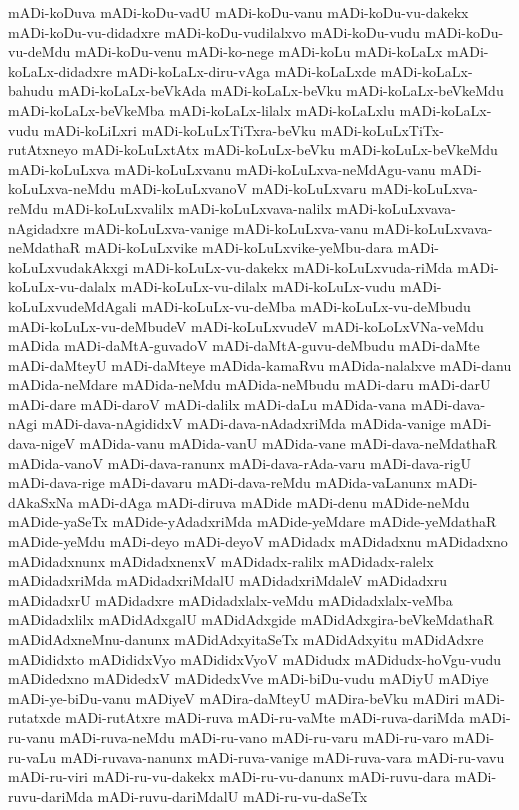 {mADi-koDuva
mADi-koDu-vadU
mADi-koDu-vanu
mADi-koDu-vu-dakekx
mADi-koDu-vu-didadxre
mADi-koDu-vudilalxvo
mADi-koDu-vudu
mADi-koDu-vu-deMdu
mADi-koDu-venu
mADi-ko-nege
mADi-koLu
mADi-koLaLx
mADi-koLaLx-didadxre
mADi-koLaLx-diru-vAga
mADi-koLaLxde
mADi-koLaLx-bahudu
mADi-koLaLx-beVkAda
mADi-koLaLx-beVku
mADi-koLaLx-beVkeMdu
mADi-koLaLx-beVkeMba
mADi-koLaLx-lilalx
mADi-koLaLxlu
mADi-koLaLx-vudu
mADi-koLiLxri
mADi-koLuLxTiTxra-beVku
mADi-koLuLxTiTx-rutAtxneyo
mADi-koLuLxtAtx
mADi-koLuLx-beVku
mADi-koLuLx-beVkeMdu
mADi-koLuLxva
mADi-koLuLxvanu
mADi-koLuLxva-neMdAgu-vanu
mADi-koLuLxva-neMdu
mADi-koLuLxvanoV
mADi-koLuLxvaru
mADi-koLuLxva-reMdu
mADi-koLuLxvalilx
mADi-koLuLxvava-nalilx
mADi-koLuLxvava-nAgidadxre
mADi-koLuLxva-vanige
mADi-koLuLxva-vanu
mADi-koLuLxvava-neMdathaR
mADi-koLuLxvike
mADi-koLuLxvike-yeMbu-dara
mADi-koLuLxvudakAkxgi
mADi-koLuLx-vu-dakekx
mADi-koLuLxvuda-riMda
mADi-koLuLx-vu-dalalx
mADi-koLuLx-vu-dilalx
mADi-koLuLx-vudu
mADi-koLuLxvudeMdAgali
mADi-koLuLx-vu-deMba
mADi-koLuLx-vu-deMbudu
mADi-koLuLx-vu-deMbudeV
mADi-koLuLxvudeV
mADi-koLoLxVNa-veMdu
mADida
mADi-daMtA-guvadoV
mADi-daMtA-guvu-deMbudu
mADi-daMte
mADi-daMteyU
mADi-daMteye
mADida-kamaRvu
mADida-nalalxve
mADi-danu
mADida-neMdare
mADida-neMdu
mADida-neMbudu
mADi-daru
mADi-darU
mADi-dare
mADi-daroV
mADi-dalilx
mADi-daLu
mADida-vana
mADi-dava-nAgi
mADi-dava-nAgididxV
mADi-dava-nAdadxriMda
mADida-vanige
mADi-dava-nigeV
mADida-vanu
mADida-vanU
mADida-vane
mADi-dava-neMdathaR
mADida-vanoV
mADi-dava-ranunx
mADi-dava-rAda-varu
mADi-dava-rigU
mADi-dava-rige
mADi-davaru
mADi-dava-reMdu
mADida-vaLanunx
mADi-dAkaSxNa
mADi-dAga
mADi-diruva
mADide
mADi-denu
mADide-neMdu
mADide-yaSeTx
mADide-yAdadxriMda
mADide-yeMdare
mADide-yeMdathaR
mADide-yeMdu
mADi-deyo
mADi-deyoV
mADidadx
mADidadxnu
mADidadxno
mADidadxnunx
mADidadxnenxV
mADidadx-ralilx
mADidadx-ralelx
mADidadxriMda
mADidadxriMdalU
mADidadxriMdaleV
mADidadxru
mADidadxrU
mADidadxre
mADidadxlalx-veMdu
mADidadxlalx-veMba
mADidadxlilx
mADidAdxgalU
mADidAdxgide
mADidAdxgira-beVkeMdathaR
mADidAdxneMnu-danunx
mADidAdxyitaSeTx
mADidAdxyitu
mADidAdxre
mADididxto
mADididxVyo
mADididxVyoV
mADidudx
mADidudx-hoVgu-vudu
mADidedxno
mADidedxV
mADidedxVve
mADi-biDu-vudu
mADiyU
mADiye
mADi-ye-biDu-vanu
mADiyeV
mADira-daMteyU
mADira-beVku
mADiri
mADi-rutatxde
mADi-rutAtxre
mADi-ruva
mADi-ru-vaMte
mADi-ruva-dariMda
mADi-ru-vanu
mADi-ruva-neMdu
mADi-ru-vano
mADi-ru-varu
mADi-ru-varo
mADi-ru-vaLu
mADi-ruvava-nanunx
mADi-ruva-vanige
mADi-ruva-vara
mADi-ru-vavu
mADi-ru-viri
mADi-ru-vu-dakekx
mADi-ru-vu-danunx
mADi-ruvu-dara
mADi-ruvu-dariMda
mADi-ruvu-dariMdalU
mADi-ru-vu-daSeTx
}
